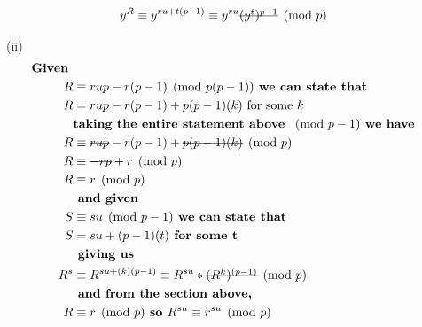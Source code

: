 \documentclass{assignment}
\begin{document}
\begin{flushleft}
\begin{problemlist}
\begin{align*}
y^R &\equiv y^{ru + t(p-1)} \equiv y^{ru} \text{\sout{$(y^{t})^{p-1}$}} \pmod{p}
\end{align*}
\item[(ii)]\hspace{1cm}\\
\begin{align*}
\textbf{Given }\\
R &\equiv rup-r(p-1) \pmod{p(p-1)}\textbf{ we can state that }\\
R &= rup -r(p-1) + p(p-1)(k)\text{ for some } k\\
&\textbf{taking the entire statement above } \pmod{p-1} \textbf{ we have}\\
R &\equiv \text{\sout{$rup$}} -r(p-1) + \text{\sout{$p(p-1)(k)$}}\pmod{p}\\
R &\equiv \text{\sout{$-rp$}} +r \pmod{p}\\
R &\equiv r \pmod{p}\\
&\textbf{ and given }\\
S &\equiv su \pmod{p-1}\textbf{ we can state that }\\  
S &= su + (p-1)(t) \textbf{ for some t}\\
&\textbf{ giving us }\\
R^s &\equiv R^{su + (k)(p-1)} \equiv R^{su} * \text{\sout{$(R^{k})^{(p-1)}$}} \pmod{p}\\
&\textbf{ and from the section above, }\\
R &\equiv r \pmod{p} \textbf{ so } R^{su} \equiv r^{su} \pmod{p}\\
\end{align*}
\end{problemlist}
\end{flushleft}
\end{document}
